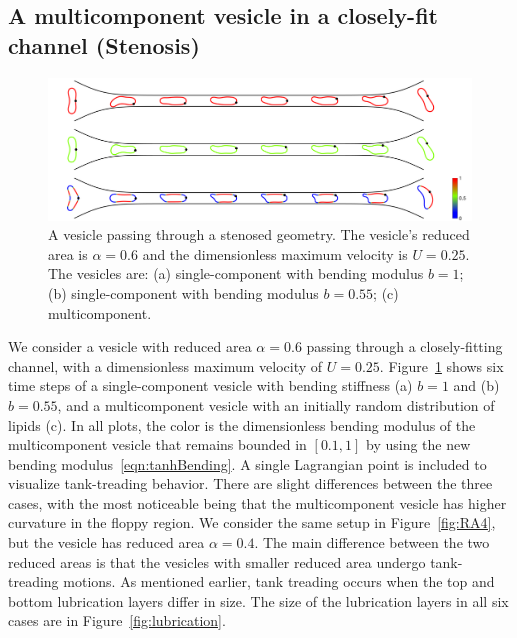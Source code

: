 \documentclass[twoside,twocolumn,9pt]{article}
\newcommand{\subfigimg}[3][,]{%
  \setbox1=\hbox{\texttt{[image: \#3]}}%
  \leavevmode\rlap{\usebox1}%
  \rlap{\hspace*{0pt}\raisebox{\dimexpr\ht1-0\baselineskip}{\bf
  \normalsize #2}}%
  \phantom{\usebox1}%
}
\begin{document}
\subsection{\label{subsec:Stenosis}A multicomponent vesicle in a closely-fit channel (Stenosis)}

\begin{figure}[b]
  \centering
  \includegraphics[width=0.9\linewidth]{figures/STENOSIS_RAp6MCp5.pdf}
  \caption{\label{fig:RA6} \small A vesicle passing through a stenosed
  geometry. The vesicle's reduced area is $\alpha = 0.6$ and the
  dimensionless maximum velocity is $U = 0.25$. The vesicles are: (a)
  single-component with bending modulus $b=1$; (b) single-component with
  bending modulus $b=0.55$; (c) multicomponent.}
\end{figure}


We consider a vesicle with reduced area $\alpha = 0.6$ passing through a
closely-fitting channel, with a dimensionless maximum velocity of $U =
0.25$. Figure~\ref{fig:RA6} shows six time steps of a single-component
vesicle with bending stiffness (a) $b=1$ and (b) $b=0.55$, and a
multicomponent vesicle with an initially random distribution of lipids
(c). In all plots, the color is the dimensionless bending modulus of the
multicomponent vesicle that remains bounded in $[0.1,1]$ by using the
new bending modulus~\eqref{eqn:tanhBending}. A single Lagrangian point
is included to visualize tank-treading behavior. There are slight
differences between the three cases, with the most noticeable being that
the multicomponent vesicle has higher curvature in the floppy region. We
consider the same setup in Figure~\ref{fig:RA4}, but the vesicle has
reduced area $\alpha = 0.4$. The main difference between the two reduced
areas is that the vesicles with smaller reduced area undergo
tank-treading motions. As mentioned earlier, tank treading occurs when
the top and bottom lubrication layers differ in size. The size of the
lubrication layers in all six cases are in Figure~\ref{fig:lubrication}. 
\end{document}
